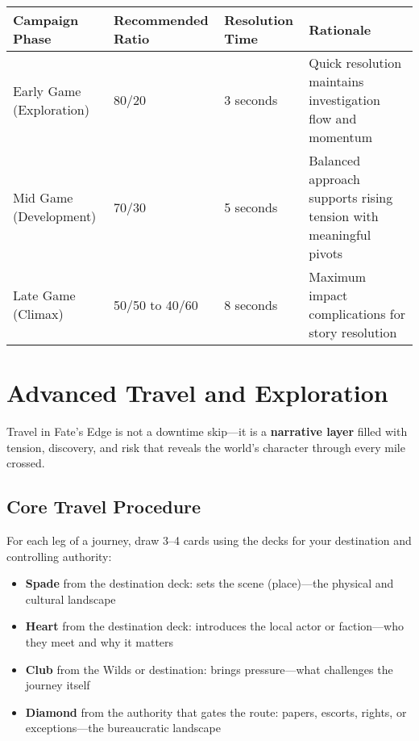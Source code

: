 \begin{fatebox}
\begin{tabularx}{\textwidth}{lXXX}
\toprule
\textbf{Campaign Phase} & \textbf{Recommended Ratio} & \textbf{Resolution Time} & \textbf{Rationale} \\
\midrule
Early Game (Exploration) & 80/20 & 3 seconds & Quick resolution maintains investigation flow and momentum \\
Mid Game (Development) & 70/30 & 5 seconds & Balanced approach supports rising tension with meaningful pivots \\
Late Game (Climax) & 50/50 to 40/60 & 8 seconds & Maximum impact complications for story resolution \\
\bottomrule
\end{tabularx}
\end{fatebox}

\section*{Advanced Travel and Exploration}

Travel in Fate's Edge is not a downtime skip---it is a \textbf{narrative layer} filled with tension, discovery, and risk that reveals the world's character through every mile crossed.

\subsection*{Core Travel Procedure}

For each leg of a journey, draw 3--4 cards using the decks for your destination and controlling authority:

\begin{itemize}
    \item \textbf{Spade} from the destination deck: sets the scene (place)—the physical and cultural landscape
    \item \textbf{Heart} from the destination deck: introduces the local actor or faction—who they meet and why it matters
    \item \textbf{Club} from the Wilds or destination: brings pressure—what challenges the journey itself
    \item \textbf{Diamond} from the authority that gates the route: papers, escorts, rights, or exceptions—the bureaucratic landscape
\end{itemize}


